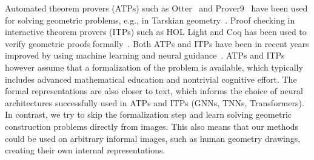 Automated theorem provers (ATPs) such as Otter~\cite{MW97} and Prover9~\cite{McC-Prover9-URL} have been used for solving geometric problems, e.g., in Tarskian geometry~\cite{BeesonW17,DurdevicNJ15,Qua92-Book}. Proof checking in interactive theorem provers (ITPs) such as HOL Light and Coq has been used to verify geometric proofs formally~\cite{BeesonNW19}. Both ATPs and ITPs have been in recent years improved by using machine learning and neural guidance~\cite{JakubuvCOP0U20,GauthierKUKN21}. ATPs and ITPs however assume that a formalization of the problem is available, which typically includes advanced mathematical education and nontrivial cognitive effort. The formal representations are also closer to text, which informs the choice of neural architectures successfully used in ATPs and ITPs (GNNs, TNNs, Transformers).
In contrast, we try to skip the formalization step and learn solving geometric construction problems directly from images.
This also means that our methods could be used on arbitrary informal images, such as human geometry drawings, creating their own internal representations.
